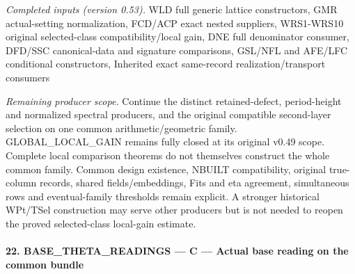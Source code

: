 \documentclass[11pt,a4paper]{article}
\numberwithin{equation}{section}
\theoremstyle{remark}\newtheorem{remark}[theorem]{Remark}
\begin{document}
\emph{Completed inputs (version 0.53).} WLD full generic lattice constructors, GMR actual-setting normalization, FCD/ACP exact nested suppliers, WRS1-WRS10 original selected-class compatibility/local gain, DNE full denominator consumer, DFD/SSC canonical-data and signature comparisons, GSL/NFL and AFE/LFC conditional constructors, Inherited exact same-record realization/transport consumers

\emph{Remaining producer scope.} Continue the distinct retained-defect, period-height and normalized spectral producers, and the original compatible second-layer selection on one common arithmetic/geometric family. GLOBAL\_\allowbreak LOCAL\_\allowbreak GAIN remains fully closed at its original v0.49 scope. Complete local comparison theorems do not themselves construct the whole common family. Common design existence, NBUILT compatibility, original true-column records, shared fields/embeddings, Fits and eta agreement, simultaneous rows and eventual-family thresholds remain explicit. A stronger historical WPt/TSel construction may serve other producers but is not needed to reopen the proved selected-class local-gain estimate.



\paragraph{22. BASE\_\allowbreak THETA\_\allowbreak READINGS — C — Actual base reading on the common bundle}
\end{document}

